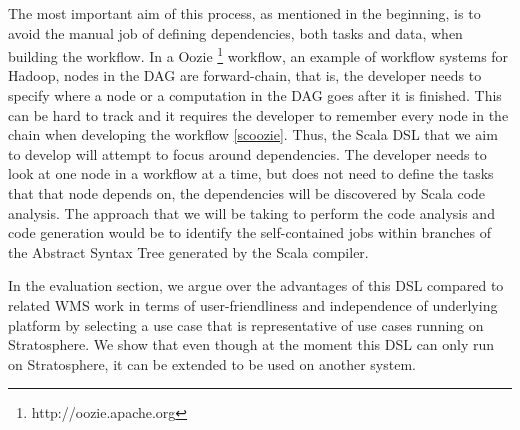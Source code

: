 The most important aim of this process, as mentioned in the beginning, is to avoid the manual job of defining dependencies,  both tasks and data, when building the workflow. In a Oozie \footnote{\label{oozie}http://oozie.apache.org} workflow, an example of workflow systems for Hadoop, nodes in the DAG are forward-chain, that is, the developer needs to specify where a node or a computation in the DAG goes after it is finished. This can be hard to track and it requires the developer to remember every node in the chain when developing the workflow \cref{scoozie}. Thus, the Scala DSL that we aim to develop will attempt to focus around dependencies. The developer needs to look at one node in a workflow at a time, but does not need to define the tasks that that node depends on, the dependencies will be discovered by Scala code analysis. The approach that we will be taking to perform the code analysis and code generation would be to identify the self-contained jobs within branches of the Abstract Syntax Tree generated by the Scala compiler. 

In the evaluation section, we argue over the advantages of this DSL compared to related WMS work in terms of user-friendliness and independence of underlying platform by selecting a use case that is representative of use cases running on Stratosphere. We show that even though at the moment this DSL can only run on Stratosphere, it can be extended to be used on another system. 